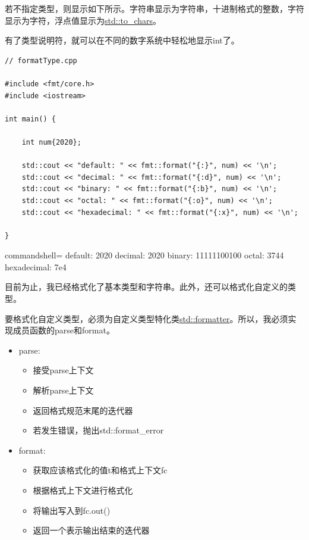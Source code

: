 若不指定类型，则显示如下所示。字符串显示为字符串，十进制格式的整数，字符显示为字符，浮点值显示为\href{https://en.cppreference.com/w/cpp/utility/to_chars}{std::to\_chars}。

有了类型说明符，就可以在不同的数字系统中轻松地显示int了。

\begin{lstlisting}[style=styleCXX]
// formatType.cpp

#include <fmt/core.h>
#include <iostream>

int main() {

	int num{2020};
	
	std::cout << "default: " << fmt::format("{:}", num) << '\n';
	std::cout << "decimal: " << fmt::format("{:d}", num) << '\n';
	std::cout << "binary: " << fmt::format("{:b}", num) << '\n';
	std::cout << "octal: " << fmt::format("{:o}", num) << '\n';
	std::cout << "hexadecimal: " << fmt::format("{:x}", num) << '\n';

}
\end{lstlisting}

\begin{tcblisting}{commandshell={}}
default:     2020
decimal:     2020
binary:      11111100100
octal:       3744
hexadecimal: 7e4
\end{tcblisting}

目前为止，我已经格式化了基本类型和字符串。此外，还可以格式化自定义的类型。


要格式化自定义类型，必须为自定义类型特化类\href{https://en.cppreference.com/w/cpp/utility/format/formatter}{std::formatter}。所以，我必须实现成员函数的parse和format。

\begin{itemize}
\item 
parse:
\begin{itemize}
\item 
接受parse上下文

\item 
解析parse上下文

\item 
返回格式规范末尾的迭代器

\item 
若发生错误，抛出std::format\_error
\end{itemize}

\item 
format:
\begin{itemize}
\item 
获取应该格式化的值t和格式上下文fc

\item 
根据格式上下文进行格式化

\item 
将输出写入到fc.out()

\item 
返回一个表示输出结束的迭代器
\end{itemize}
\end{itemize}

